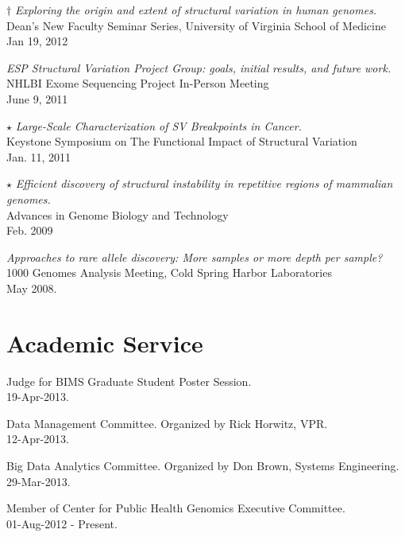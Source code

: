 \documentclass[margin,line]{cv}
\begin{document}
\begin{resume}
    $\dagger$ \textit{Exploring the origin and extent of structural variation in human genomes.} \\
    Dean’s New Faculty Seminar Series, University of Virginia School of Medicine \\
    Jan 19, 2012

    \textit{ESP Structural Variation Project Group: goals, initial results, and future work.} \\
    NHLBI Exome Sequencing Project In-Person Meeting \\
    June 9, 2011
    
    $\star$ \textit{Large-Scale Characterization of SV Breakpoints in Cancer.} \\
    Keystone Symposium on The Functional Impact of Structural Variation \\
    Jan. 11, 2011

    $\star$ \textit{Efficient discovery of structural instability in repetitive regions of mammalian genomes.} \\
    Advances in Genome Biology and Technology \\
    Feb. 2009

    \textit{Approaches to rare allele discovery: More samples or more depth per sample? } \\
    1000 Genomes Analysis Meeting, Cold Spring Harbor Laboratories \\
    May 2008.
    
    \section{\mysidestyle Academic Service}

    Judge for BIMS Graduate Student Poster Session. \\
    19-Apr-2013.

    Data Management Committee. Organized by Rick Horwitz, VPR.\\
    12-Apr-2013.

    Big Data Analytics Committee. Organized by Don Brown, Systems Engineering.\\
    29-Mar-2013.

    Member of Center for Public Health Genomics Executive Committee.\\
    01-Aug-2012 - Present.
    

\end{resume}
\end{document}

